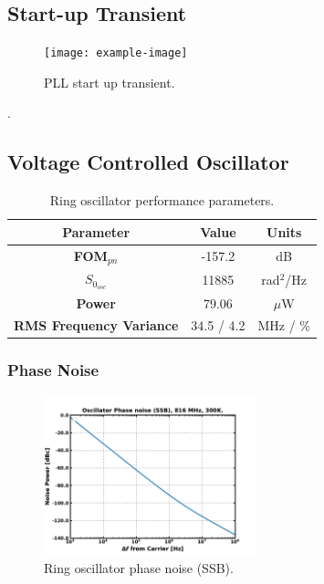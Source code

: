 \subsection{Start-up Transient}
		\begin{figure}[htb!]
	        \centering
	        \texttt{[image: example-image]}
		    \caption{PLL start up transient.}
		    \label{fig:sim_pll_trans}
		\end{figure}
{\color{white}.}

\FloatBarrier\pagebreak
\subsection{Voltage Controlled Oscillator}

		\begin{table}[htb!]
			\centering
			\def\arraystretch{1.5}		
			\setlength\arrayrulewidth{0.75pt}
			\setlength{\tabcolsep}{1em} %
			\begin{tabular}{|c|c|c|}
				\hline 
				\rule[-1ex]{0pt}{2.5ex} \cellcolor{gray!40}\textbf{Parameter} & \cellcolor{gray!40}\textbf{Value} & \cellcolor{gray!40}\textbf{Units}\\ 
				\hline 
				\rule[-1ex]{0pt}{2.5ex} \textbf{FOM$_{pn}$} & -157.2 & dB  \\ 
				\hline 
				\rule[-1ex]{0pt}{2.5ex} $S_{0_{osc}}$ &  11885 &  rad$^2$/Hz  \\ 
				\hline 
				\rule[-1ex]{0pt}{2.5ex} \textbf{Power} &  79.06 &  $\mu$W  \\ 
				\hline 
				\rule[-1ex]{0pt}{2.5ex} \textbf{RMS Frequency Variance} &  34.5 / 4.2 &  MHz / \%  \\ 
				\hline 
			\end{tabular} 
			\caption{Ring oscillator performance parameters.}
			\label{tab:ro_perf}
		\end{table}   

	\subsubsection{Phase Noise}
		\begin{figure}[htb!]
	        \centering
	        \includegraphics[width=0.55\textwidth, angle=0]{./figs/results/osc_pnoise}
		    \caption{Ring oscillator phase noise (SSB).}
		    \label{fig:ro_pnoise}
		\end{figure}
	\FloatBarrier

